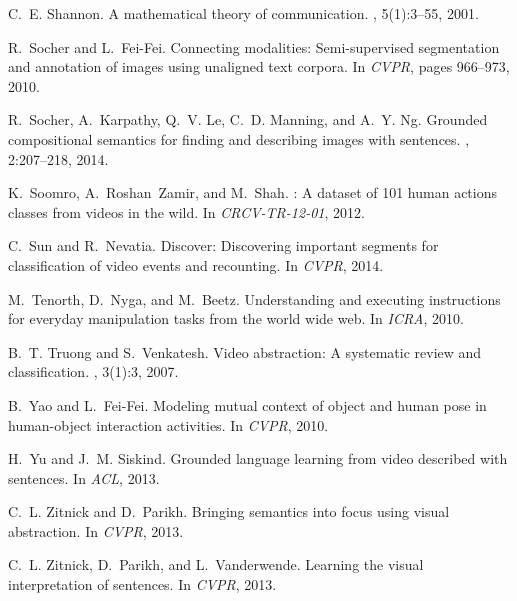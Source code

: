 \documentclass[10pt,twocolumn,letterpaper]{article}
\begin{document}
\begin{thebibliography}{10}
C.~E. Shannon.
\newblock A mathematical theory of communication.
,
  5(1):3--55, 2001.

R.~Socher and L.~Fei-Fei.
\newblock Connecting modalities: Semi-supervised segmentation and annotation of
  images using unaligned text corpora.
\newblock In {\em CVPR}, pages 966--973, 2010.

R.~Socher, A.~Karpathy, Q.~V. Le, C.~D. Manning, and A.~Y. Ng.
\newblock Grounded compositional semantics for finding and describing images
  with sentences.
, 2:207--218, 2014.

K.~Soomro, A.~Roshan~Zamir, and M.~Shah.
: A dataset of 101 human actions classes from videos in the
  wild.
\newblock In {\em CRCV-TR-12-01}, 2012.

C.~Sun and R.~Nevatia.
\newblock Discover: Discovering important segments for classification of video
  events and recounting.
\newblock In {\em CVPR}, 2014.

M.~Tenorth, D.~Nyga, and M.~Beetz.
\newblock Understanding and executing instructions for everyday manipulation
  tasks from the world wide web.
\newblock In {\em ICRA}, 2010.

B.~T. Truong and S.~Venkatesh.
\newblock Video abstraction: A systematic review and classification.
, 3(1):3, 2007.

B.~Yao and L.~Fei-Fei.
\newblock Modeling mutual context of object and human pose in human-object
  interaction activities.
\newblock In {\em CVPR}, 2010.

H.~Yu and J.~M. Siskind.
\newblock Grounded language learning from video described with sentences.
\newblock In {\em ACL}, 2013.

C.~L. Zitnick and D.~Parikh.
\newblock Bringing semantics into focus using visual abstraction.
\newblock In {\em CVPR}, 2013.

C.~L. Zitnick, D.~Parikh, and L.~Vanderwende.
\newblock Learning the visual interpretation of sentences.
\newblock In {\em CVPR}, 2013.

\end{thebibliography}
\fi
\end{document}
